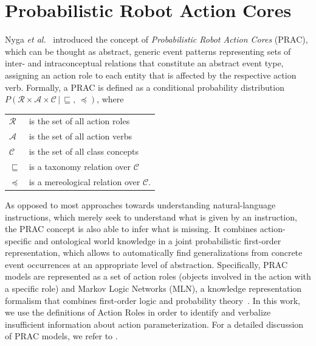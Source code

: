 \documentclass[oribibl]{llncs}
\begin{document}
\section{Probabilistic Robot Action Cores}

Nyga \emph{et al.}~\cite{nyga12actioncore} introduced the concept of 
\emph{Probabilistic Robot Action Cores} (PRAC), which can be thought as abstract,
generic event patterns representing sets of 
inter- and intraconceptual relations that constitute an abstract 
event type, assigning an action role to each entity that is affected 
by the respective action verb. Formally, a PRAC is defined as a conditional
probability distribution
$P\left(\mathcal{R}\times\mathcal{A}\times\mathcal{C}\,|\,\sqsubseteq
,\, \preceq \right)\nonumber$, where 

\begin{center} \begin{tabular}{ll}
    $\mathcal{R}$  & is the set of all action roles\\
    $\mathcal{A}$  & is the set of all action verbs\\
    $\mathcal{C}$  & is the set of all class concepts\\
    $\sqsubseteq$ & is a taxonomy relation over $\mathcal{C}$\\
    $\preceq$	& is a mereological relation over $\mathcal{C}$.
\end{tabular}
\end{center}
As opposed to most approaches towards understanding natural-language 
instructions, which merely seek to understand what is given by an 
instruction, the PRAC concept is also able to infer what is missing. 
It combines action-specific and ontological world knowledge in a 
joint probabilistic first-order representation, which allows to 
automatically find generalizations from concrete event occurrences 
at an appropriate level of abstraction. Specifically, PRAC models 
are represented as a set of action roles (objects involved in the 
action with a specific role) and Markov Logic Networks (MLN), a 
knowledge representation formalism that combines first-order logic 
and probability theory~\cite{DBLP:journals/ml/RichardsonD06}. In this
work, we use the definitions of Action Roles in order to identify and
verbalize insufficient information about action parameterization. For a 
detailed discussion of PRAC models, we refer to \cite{nyga12actioncore}.
\end{document}
